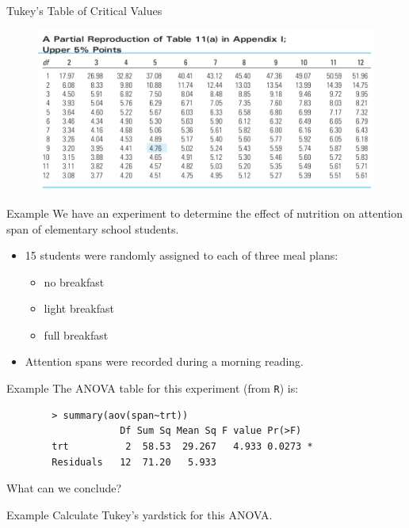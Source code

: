 \begin{frame}{Tukey's Table of Critical Values}
    \begin{figure}
        \centering
        \includegraphics[width=\textwidth]{images/tukeycvs.png}
    \end{figure}
\end{frame}

\begin{frame}{Example}
    We have an experiment to determine the effect of nutrition on attention span of elementary school students.
    \begin{itemize}
        \item 15 students were randomly assigned to each of three meal plans:
        \begin{itemize}
            \item no breakfast
            \item light breakfast
            \item full breakfast
        \end{itemize}
        \item Attention spans were recorded during a morning reading.
    \end{itemize}
\end{frame}

\begin{frame}[fragile]{Example}
    The ANOVA table for this experiment (from \texttt{R}) is:
    \begin{verbatim}
        > summary(aov(span~trt))
                    Df Sum Sq Mean Sq F value Pr(>F)  
        trt          2  58.53  29.267   4.933 0.0273 *
        Residuals   12  71.20   5.933                 
    \end{verbatim}
    What can we conclude?
\end{frame}

\begin{frame}{Example}
    Calculate Tukey's yardstick for this ANOVA.
\end{frame}

